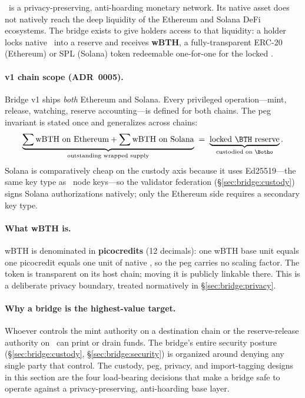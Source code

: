 \Botho\ is a privacy-preserving, anti-hoarding monetary network. Its native
asset does not natively reach the deep liquidity of the Ethereum and Solana
DeFi ecosystems. The bridge exists to give holders access to that liquidity: a
holder locks native \BTH\ into a reserve and receives \textbf{wBTH}, a
fully-transparent ERC-20 (Ethereum) or SPL (Solana) token redeemable
one-for-one for the locked \BTH.

\paragraph{v1 chain scope (ADR~0005).} Bridge v1 ships \emph{both} Ethereum and
Solana. Every privileged operation---mint, release, watching, reserve
accounting---is defined for both chains. The peg invariant is stated once and
generalizes across chains:
\begin{equation}
\label{eq:bridge:peg}
\underbrace{\sum \text{wBTH on Ethereum} + \sum \text{wBTH on Solana}}_{\text{outstanding wrapped supply}}
\;=\; \underbrace{\text{locked \BTH\ reserve}}_{\text{custodied on \Botho}}.
\end{equation}
Solana is comparatively cheap on the custody axis because it uses Ed25519---the
same key type as \Botho\ node keys---so the validator federation
(\S\ref{sec:bridge:custody}) signs Solana authorizations natively; only the
Ethereum side requires a secondary key type.

\paragraph{What wBTH is.} wBTH is denominated in \textbf{picocredits} (12
decimals): one wBTH base unit equals one picocredit equals one unit of native
\BTH, so the peg carries no scaling factor.
The token is transparent on its host chain; moving it is publicly linkable
there. This is a deliberate privacy boundary, treated normatively in
\S\ref{sec:bridge:privacy}.

\paragraph{Why a bridge is the highest-value target.} Whoever controls the
mint authority on a destination chain or the reserve-release authority on
\Botho\ can print or drain funds. The bridge's entire security posture
(\S\ref{sec:bridge:custody}, \S\ref{sec:bridge:security}) is organized around
denying any single party that control. The custody, peg, privacy, and
import-tagging designs in this section are the four load-bearing decisions that
make a bridge safe to operate against a privacy-preserving, anti-hoarding base
layer.

